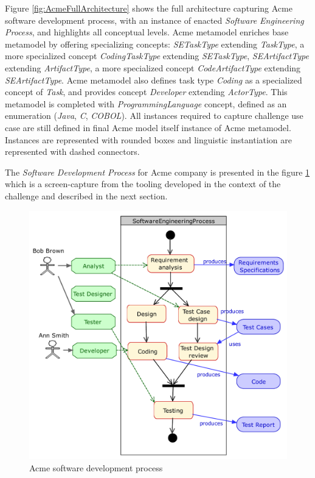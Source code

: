 Figure \ref{fig:AcmeFullArchitecture} shows the full architecture capturing Acme software development process, with an instance of enacted \textit{Software Engineering Process}, and highlights all conceptual levels. Acme metamodel enriches base metamodel by offering specializing concepts: \textit{SETaskType} extending \textit{TaskType}, a more specialized concept \textit{CodingTaskType} extending \textit{SETaskType}, \textit{SEArtifactType} extending \textit{ArtifactType}, a more specialized concept \textit{CodeArtifactType} extending \textit{SEArtifactType}. Acme metamodel also defines task type \textit{Coding} as a specialized concept of \textit{Task}, and provides concept \textit{Developer} extending \textit{ActorType}. This metamodel is completed with \textit{ProgrammingLanguage} concept, defined as an enumeration (\textit{Java}, \textit{C}, \textit{COBOL}). All instances required to capture challenge use case are still defined in final Acme model itself instance of Acme metamodel. Instances are represented with rounded boxes and linguistic instantiation are represented with dashed connectors.

The \textit{Software Development Process} for Acme company is presented in the figure \ref{fig:AcmeSoftwareDevelopmentProcess} which is a screen-capture from the tooling developed in the context of the challenge and described in the next section. 

\begin{figure}
 \centering
    \includegraphics[width=1.0 \columnwidth]{Figures/SoftwareEngineeringProcessCroped.pdf}
     \caption{Acme software development process}
    \label{fig:AcmeSoftwareDevelopmentProcess}
\end{figure}

